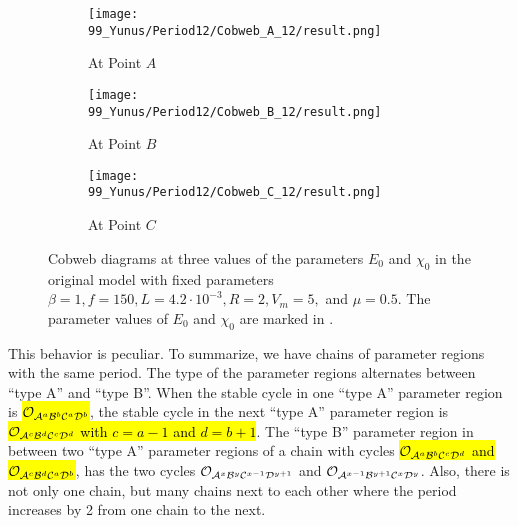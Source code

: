 \begin{figure}
	\centering
	\begin{subfigure}{0.3\textwidth}
		\centering
		\texttt{[image: 99\_Yunus/Period12/Cobweb\_A\_12/result.png]}
		\caption{At Point $A$}
		\label{fig:setup.og.dynamics.cobweb.A}
	\end{subfigure}
	\begin{subfigure}{0.3\textwidth}
		\centering
		\texttt{[image: 99\_Yunus/Period12/Cobweb\_B\_12/result.png]}
		\caption{At Point $B$}
		\label{fig:setup.og.dynamics.cobweb.B}
	\end{subfigure}
	\begin{subfigure}{0.3\textwidth}
		\centering
		\texttt{[image: 99\_Yunus/Period12/Cobweb\_C\_12/result.png]}
		\caption{At Point $C$}
		\label{fig:setup.og.dynamics.cobweb.C}
	\end{subfigure}
	\caption[Cobweb diagrams of the original model]{
		Cobweb diagrams at three values of the parameters $E_0$ and $\chi_0$ in the original model with fixed parameters $\beta = 1, f = 150, L = 4.2 \cdot 10^{-3}, R = 2, V_m = 5,$ and $\mu = 0.5$.
		The parameter values of $E_0$ and $\chi_0$ are marked in .
	}
	\label{fig:setup.og.dynamics.cobwebs}
\end{figure}

This behavior is peculiar.
To summarize, we have chains of parameter regions with the same period.
The type of the parameter regions alternates between ``type A'' and ``type B''.
When the stable cycle in one ``type A'' parameter region is \hl{$\mathcal{O}_{\mathcal{A}^a\mathcal{B}^b\mathcal{C}^a\mathcal{D}^b}$}, the stable cycle in the next ``type A'' parameter region is \hl{$\mathcal{O}_{\mathcal{A}^{c}\mathcal{B}^{d}\mathcal{C}^{c}\mathcal{D}^{d}}$ with $c = a - 1$ and $d = b + 1$}.
The ``type B'' parameter region in between two ``type A'' parameter regions of a chain with cycles \hl{$\mathcal{O}_{\mathcal{A}^a\mathcal{B}^b\mathcal{C}^c\mathcal{D}^d}$ and $\mathcal{O}_{\mathcal{A}^{c}\mathcal{B}^{d}\mathcal{C}^{a}\mathcal{D}^{b}}$}, has the two cycles $\mathcal{O}_{\mathcal{A}^x\mathcal{B}^y\mathcal{C}^{x-1}\mathcal{D}^{y+1}}$ and $\mathcal{O}_{\mathcal{A}^{x-1}\mathcal{B}^{y+1}\mathcal{C}^x\mathcal{D}^y}$.
Also, there is not only one chain, but many chains next to each other where the period increases by 2 from one chain to the next.
